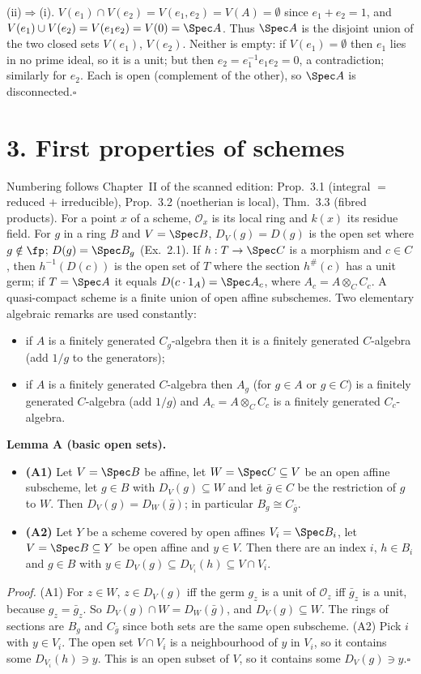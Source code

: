 \documentclass[11pt]{article}
\begin{document}
(ii)$\Rightarrow$(i). $V(e_1)\cap V(e_2)=V(e_1,e_2)=V(A)=\emptyset$ since $e_1+e_2=1$, and $V(e_1)\cup V(e_2)=V(e_1e_2)=V(0)=\Spec A$. Thus $\Spec A$ is the disjoint union of the two closed sets $V(e_1)$, $V(e_2)$. Neither is empty: if $V(e_1)=\emptyset$ then $e_1$ lies in no prime ideal, so it is a unit; but then $e_2=e_1^{-1}e_1e_2=0$, a contradiction; similarly for $e_2$. Each is open (complement of the other), so $\Spec A$ is disconnected.\hfill$\square$

\section*{3. First properties of schemes}

Numbering follows Chapter~II of the scanned edition: Prop.~3.1 (integral $=$ reduced $+$ irreducible), Prop.~3.2 (noetherian is local), Thm.~3.3 (fibred products). For a point $x$ of a scheme, $\mathcal O_x$ is its local ring and $k(x)$ its residue field. For $g$ in a ring $B$ and $V=\Spec B$, $D_V(g)=D(g)$ is the open set where $g\notin\fp$; $D(g)=\Spec B_g$ (Ex.~2.1). If $h:T\to\Spec C$ is a morphism and $c\in C$, then $h^{-1}(D(c))$ is the open set of $T$ where the section $h^\#(c)$ has a unit germ; if $T=\Spec A$ it equals $D(c\cdot 1_A)=\Spec A_c$, where $A_c=A\otimes_CC_c$. A quasi-compact scheme is a finite union of open affine subschemes. Two elementary algebraic remarks are used constantly:
\begin{itemize}
\item if $A$ is a finitely generated $C_g$-algebra then it is a finitely generated $C$-algebra (add $1/g$ to the generators);
\item if $A$ is a finitely generated $C$-algebra then $A_g$ (for $g\in A$ or $g\in C$) is a finitely generated $C$-algebra (add $1/g$) and $A_c=A\otimes_C C_c$ is a finitely generated $C_c$-algebra.
\end{itemize}

\textbf{Lemma A (basic open sets).}
\begin{itemize}
\item \textbf{(A1)} Let $V=\Spec B$ be affine, let $W=\Spec C\subseteq V$ be an open affine subscheme, let $g\in B$ with $D_V(g)\subseteq W$ and let $\bar g\in C$ be the restriction of $g$ to $W$. Then $D_V(g)=D_W(\bar g)$; in particular $B_g\cong C_{\bar g}$.
\item \textbf{(A2)} Let $Y$ be a scheme covered by open affines $V_i=\Spec B_i$, let $V=\Spec B\subseteq Y$ be open affine and $y\in V$. Then there are an index $i$, $h\in B_i$ and $g\in B$ with $y\in D_V(g)\subseteq D_{V_i}(h)\subseteq V\cap V_i$.
\end{itemize}
\emph{Proof.} (A1) For $z\in W$, $z\in D_V(g)$ iff the germ $g_z$ is a unit of $\mathcal O_z$ iff $\bar g_z$ is a unit, because $g_z=\bar g_z$. So $D_V(g)\cap W=D_W(\bar g)$, and $D_V(g)\subseteq W$. The rings of sections are $B_g$ and $C_{\bar g}$ since both sets are the same open subscheme. (A2) Pick $i$ with $y\in V_i$. The open set $V\cap V_i$ is a neighbourhood of $y$ in $V_i$, so it contains some $D_{V_i}(h)\ni y$. This is an open subset of $V$, so it contains some $D_V(g)\ni y$.\hfill$\square$
\end{document}
